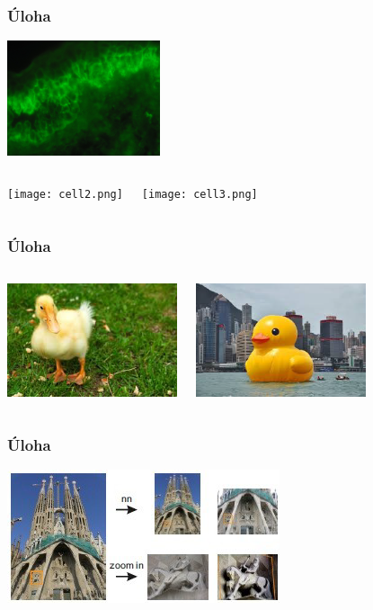 \documentclass{beamer}
\begin{document}
\begin{frame}
\frametitle{Úloha}
      \centering
      \includegraphics[width=45mm]{cell1.png}
      
      \vspace{1em}

  \begin{columns}[onlytextwidth,T]
      \column{50mm}
      \centering
      \texttt{[image: cell2.png]}

      \column{50mm}
      \centering
      \texttt{[image: cell3.png]}
        \end{columns}
\end{frame}

\begin{frame}
\frametitle{Úloha}

  \begin{columns}[onlytextwidth,T]
      \column{55mm}
      \centering
      \includegraphics[width=50mm]{duck1.png}

      \column{55mm}
      \centering
      \includegraphics[width=50mm]{duck2.png}
        \end{columns}
\end{frame}

\begin{frame}
\frametitle{Úloha}
\centering
\includegraphics[width=\textwidth]{sagrada.png}
\end{frame}
\end{document}
